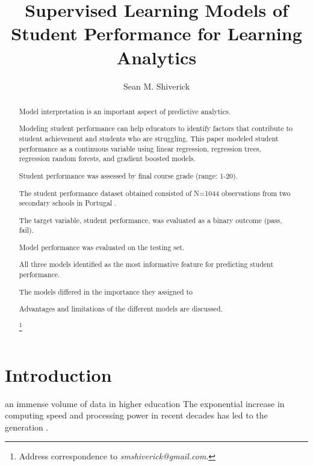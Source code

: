 \documentclass[sigconf]{acmart}
\begin{document}
  \title{Supervised Learning Models of Student Performance for Learning Analytics}
  \author{Sean M. Shiverick}
\renewcommand{\shortauthors}{S.M. Shiverick}


\begin{abstract}

Model interpretation is an important aspect of predictive analytics.

Modeling student performance can help educators to identify factors that 
contribute to student achievement and students who are struggling. This 
paper modeled student performance as a continuous variable using linear 
regression, regression trees, regression random forests, and gradient 
boosted models. 

Student performance was assessed by final course grade (range: 1-20).

The student performance dataset obtained consisted of N=1044 observations from
two secondary schools in Portugal \cite{cortez08}. 

The target variable, student performance, was 
evaluated as a binary outcome (pass, fail). 

Model performance was evaluated on the testing set. 

All three models identified as the most informative feature for predicting 
student performance. 

The models differed in the importance they assigned to

Advantages and limitations of the different models are  discussed. 

\footnote{Address correspondence to \textit{smshiverick@gmail.com}.}

\end{abstract}
\maketitle

\section{Introduction}

an immense volume of data in higher education The exponential increase in 
computing speed and processing power in recent 
decades has led to the generation 
\cite{Daniel17}. 
\end{document}
